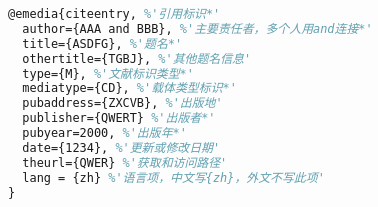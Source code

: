 \begin{lstlisting}[language=tex,escapeinside='']
%电子文献
@emedia{citeentry, %'引用标识*'
  author={AAA and BBB}, %'主要责任者，多个人用and连接*'
  title={ASDFG}, %'题名*'
  othertitle={TGBJ}, %'其他题名信息'
  type={M}, %'文献标识类型*'
  mediatype={CD}, %'载体类型标识*'
  pubaddress={ZXCVB}, %'出版地'
  publisher={QWERT} %'出版者*'
  pubyear=2000, %'出版年*'
  date={1234}, %'更新或修改日期'
  theurl={QWER} %'获取和访问路径'
  lang = {zh} %'语言项，中文写{zh}，外文不写此项'
}

\end{lstlisting}
